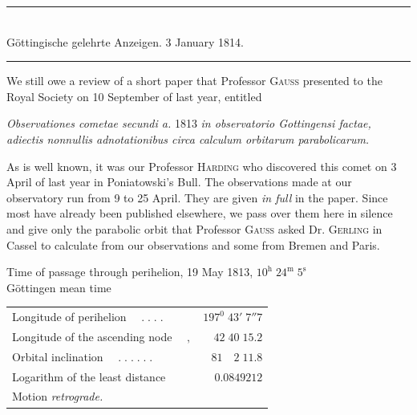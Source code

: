 \clearpage
{}
\begin{center}\rule{.75\textwidth}{.3pt}\\
Göttingische gelehrte Anzeigen. 3 January 1814.\\
\rule{.75\textwidth}{.3pt}\end{center}
We still owe a review of a short paper that Professor \textsc{Gauss} presented to the Royal Society on 10 September of last year, entitled
\begin{center}
\textit{Observationes cometae secundi a.} 1813 \textit{in observatorio Gottingensi factae, adiectis
nonnullis adnotationibus circa calculum orbitarum parabolicarum.}
\end{center}
As is well known, it was our Professor \textsc{Harding} who discovered this comet on 3 April of last year in Poniatowski’s Bull. The observations made at our observatory run from 9 to 25 April. They are given \textit{in full} in the paper. Since most have already been published elsewhere, we pass over them here in silence and give only the parabolic orbit that Professor \textsc{Gauss} asked Dr. \textsc{Gerling} in Cassel to calculate from our observations and some from Bremen and Paris.
\begin{center}\small
Time of passage through perihelion, 19 May 1813, $10^{\mathrm h}\;24^{\mathrm m}\;5^{\mathrm s}$\\
Göttingen mean time
\end{center}
\begin{center}\small
\begin{tabular}{@{}l@{\qquad}r@{}}
Longitude of perihelion $\quad.\;.\;.\;.$ & $197^0\;43'\;7''7$\\
Longitude of the ascending node $\quad,$ & $42\;40\;15.2$\\
Orbital inclination $\quad.\;.\;.\;.\;.\;.$ & $81\quad2\;11.8$\\
Logarithm of the least distance & $0.0849212$\\
\multicolumn{2}{l}{Motion \textit{retrograde.}}
\end{tabular}\end{center}

